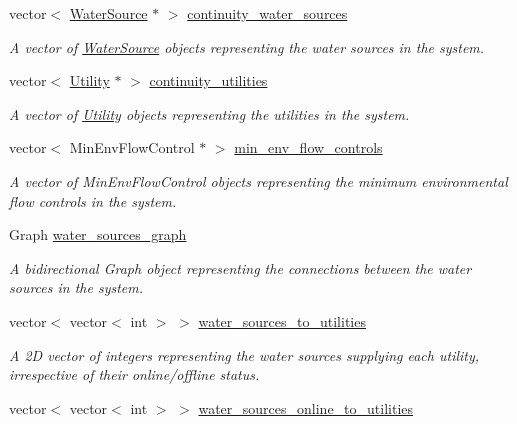 \begin{DoxyCompactItemize}
\item 
vector$<$ \mbox{\hyperlink{classWaterSource}{Water\+Source}} $\ast$ $>$ \mbox{\hyperlink{classContinuityModel_a3980284a9dd08bae4e76398d1b0d6f55}{continuity\+\_\+water\+\_\+sources}}
\begin{DoxyCompactList}\small\item\em A vector of \mbox{\hyperlink{classWaterSource}{Water\+Source}} objects representing the water sources in the system. \end{DoxyCompactList}\item 
vector$<$ \mbox{\hyperlink{classUtility}{Utility}} $\ast$ $>$ \mbox{\hyperlink{classContinuityModel_adc77a0214d553a961035ce86c93cf9be}{continuity\+\_\+utilities}}
\begin{DoxyCompactList}\small\item\em A vector of \mbox{\hyperlink{classUtility}{Utility}} objects representing the utilities in the system. \end{DoxyCompactList}\item 
vector$<$ Min\+Env\+Flow\+Control $\ast$ $>$ \mbox{\hyperlink{classContinuityModel_afc991e5c0d144020e49a97751a04b302}{min\+\_\+env\+\_\+flow\+\_\+controls}}
\begin{DoxyCompactList}\small\item\em A vector of Min\+Env\+Flow\+Control objects representing the minimum environmental flow controls in the system. \end{DoxyCompactList}\item 
Graph \mbox{\hyperlink{classContinuityModel_a563401588c6fa622f03393909a3522db}{water\+\_\+sources\+\_\+graph}}
\begin{DoxyCompactList}\small\item\em A bidirectional Graph object representing the connections between the water sources in the system. \end{DoxyCompactList}\item 
vector$<$ vector$<$ int $>$ $>$ \mbox{\hyperlink{classContinuityModel_ae8516bcbbf52650190277fc8b06c1843}{water\+\_\+sources\+\_\+to\+\_\+utilities}}
\begin{DoxyCompactList}\small\item\em A 2D vector of integers representing the water sources supplying each utility, irrespective of their online/offline status. \end{DoxyCompactList}\item 
vector$<$ vector$<$ int $>$ $>$ \mbox{\hyperlink{classContinuityModel_a6d80a7e50e022e2cdb5e912d5b3b5cf0}{water\+\_\+sources\+\_\+online\+\_\+to\+\_\+utilities}}

\end{DoxyCompactItemize}

